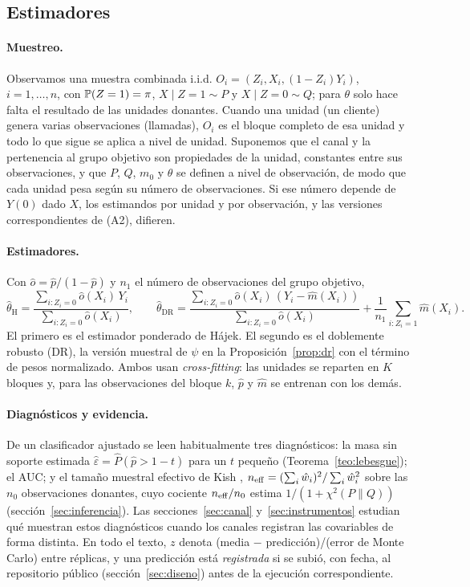 \subsection{Estimadores}\label{sec:estimadores}

\paragraph{Muestreo.} Observamos una muestra combinada i.i.d. $O_i=(Z_i,X_i,(1-Z_i)Y_i)$, $i=1,\dots,n$, con $\mathbb{P}(Z=1)=\pi$, $X\mid Z=1\sim P$ y $X\mid Z=0\sim Q$; para $\theta$ solo hace falta el resultado de las unidades donantes. Cuando una unidad (un cliente) genera varias observaciones (llamadas), $O_i$ es el bloque completo de esa unidad y todo lo que sigue se aplica a nivel de unidad. Suponemos que el canal y la pertenencia al grupo objetivo son propiedades de la unidad, constantes entre sus observaciones, y que $P$, $Q$, $m_0$ y $\theta$ se definen a nivel de observación, de modo que cada unidad pesa según su número de observaciones. Si ese número depende de $Y(0)$ dado $X$, los estimandos por unidad y por observación, y las versiones correspondientes de (A2), difieren.

\paragraph{Estimadores.} Con $\hat o=\hat p/(1-\hat p)$ y $n_1$ el número de observaciones del grupo objetivo,
\[
\hat\theta_{\mathrm{H}}=\frac{\sum_{i:Z_i=0}\hat o(X_i)\,Y_i}{\sum_{i:Z_i=0}\hat o(X_i)},\qquad
\hat\theta_{\mathrm{DR}}=\frac{\sum_{i:Z_i=0}\hat o(X_i)\,(Y_i-\hat m(X_i))}{\sum_{i:Z_i=0}\hat o(X_i)}+\frac1{n_1}\sum_{i:Z_i=1}\hat m(X_i).
\]
El primero es el estimador ponderado de Hájek. El segundo es el doblemente robusto (DR), la versión muestral de $\psi$ en la Proposición~\ref{prop:dr} con el término de pesos normalizado. Ambos usan \emph{cross-fitting}: las unidades se reparten en $K$ bloques y, para las observaciones del bloque $k$, $\hat p$ y $\hat m$ se entrenan con los demás.

\paragraph{Diagnósticos y evidencia.} De un clasificador ajustado se leen habitualmente tres diagnósticos: la masa sin soporte estimada $\hat\varepsilon=\hat P(\hat p>1-t)$ para un $t$ pequeño (Teorema~\ref{teo:lebesgue}); el AUC; y el tamaño muestral efectivo de Kish \citeyearpar{kish1965}, $n_{\mathrm{eff}}=(\sum_i\hat w_i)^2/\sum_i\hat w_i^2$ sobre las $n_0$ observaciones donantes, cuyo cociente $n_{\mathrm{eff}}/n_0$ estima $1/(1+\chi^2(P\|Q))$ (sección~\ref{sec:inferencia}). Las secciones~\ref{sec:canal} y~\ref{sec:instrumentos} estudian qué muestran estos diagnósticos cuando los canales registran las covariables de forma distinta. En todo el texto, $z$ denota (media $-$ predicción)/(error de Monte Carlo) entre réplicas, y una predicción está \emph{registrada} si se subió, con fecha, al repositorio público (sección~\ref{sec:diseno}) antes de la ejecución correspondiente.
